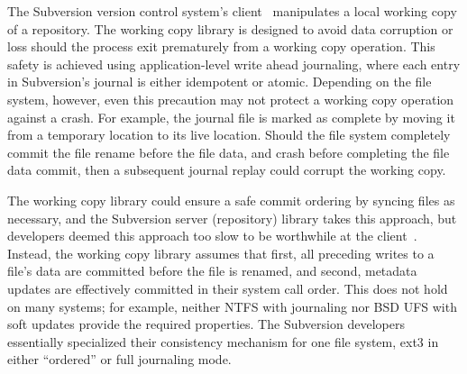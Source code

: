 \documentclass[9pt,twocolumn,letterpaper]{article}
\begin{document}

The Subversion version control system's client~\cite{svn} manipulates a
local working copy of a repository.
%
The working copy library is designed to avoid data corruption or loss
should the process exit prematurely from a working copy operation.
%
This safety is achieved using application-level write ahead journaling,
where each entry in Subversion's journal is either idempotent or
atomic.
%
Depending on the file system, however, even this precaution may not protect
a working copy operation against a crash.
%
For example, the journal file is marked as complete by moving it from
a temporary location to its live location.
%
Should the file system completely commit the file rename before
the file data, and crash before completing the file data commit, then
a subsequent journal replay could corrupt the working copy.

The working copy library could ensure a safe commit ordering by
syncing files as necessary, and the Subversion server (repository) library
takes this approach, but
%
developers deemed this approach too slow to be worthwhile at the
client~\cite{svntradeoff}.
%
Instead, the working copy library assumes that
%
first, all preceding writes to a file's data are committed before the file
is renamed,
%
and second, metadata updates are effectively committed in their system call
order.
%
%
This does not hold on
many systems; for example, neither NTFS with journaling nor BSD UFS with
soft updates provide the required properties.  The Subversion developers
essentially specialized their consistency mechanism for one file system,
ext3 in either ``ordered'' or full journaling mode.
%
\end{document}
